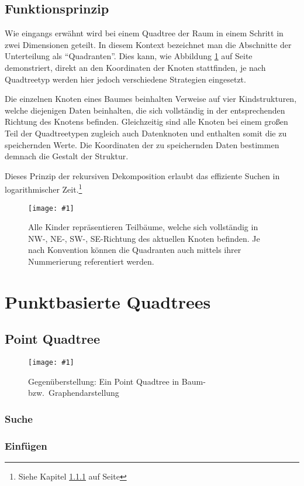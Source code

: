 \documentclass[%
			paper=a4,%
			DIV12, %
			draft=false,%
			titlepage
			]{scrartcl}
\newcommand{\myfig}[4] {
 \begin{figure}
	 \centering
	 \texttt{[image: \#1]}
	 \caption{#4}
	 \label{fig:#2}
 \end{figure}
}
\begin{document}
\subsection{Funktionsprinzip}

Wie eingangs erwähnt wird bei einem Quadtree der Raum in einem Schritt in zwei Dimensionen geteilt.
In diesem Kontext bezeichnet man die Abschnitte der Unterteilung als "`Quadranten"'.
Dies kann, wie Abbildung \ref{fig:quadtree} auf Seite \pageref{fig:quadtree} demonstriert, direkt an den Koordinaten der Knoten stattfinden, je nach Quadtreetyp werden hier jedoch verschiedene Strategien eingesetzt.

Die einzelnen Knoten eines Baumes beinhalten Verweise auf vier Kindstrukturen, welche diejenigen Daten beinhalten, die sich vollständig in der entsprechenden Richtung des Knotens befinden. 
Gleichzeitig sind alle Knoten bei einem großen Teil der Quadtreetypen zugleich auch Datenknoten und enthalten somit die zu speichernden Werte.
Die Koordinaten der zu speichernden Daten bestimmen demnach die Gestalt der Struktur.

Dieses Prinzip der rekursiven Dekomposition erlaubt das effiziente Suchen in logarithmischer Zeit.\footnote{Siehe Kapitel \ref{sec:pointquadtree-suche} auf Seite \pageref{sec:pointquadtree-suche}}
\myfig{img/quadtree}{quadtree}{width=.5\textwidth}{Alle Kinder repräsentieren Teilbäume, welche sich vollständig in NW-, NE-, SW-, SE-Richtung des aktuellen Knoten befinden. Je nach Konvention können die Quadranten auch mittels ihrer Nummerierung referentiert werden.}



\section{Punktbasierte Quadtrees}
\subsection{Point Quadtree}
\myfig{img/pointquadtree-ins7+tree-trimmed}{pointquadtree}{width=.9\textwidth}{Gegenüberstellung: Ein Point Quadtree in Baum- bzw.\ Graphendarstellung}

\subsubsection{Suche}
\label{sec:pointquadtree-suche}
\subsubsection{Einfügen}
\end{document}
